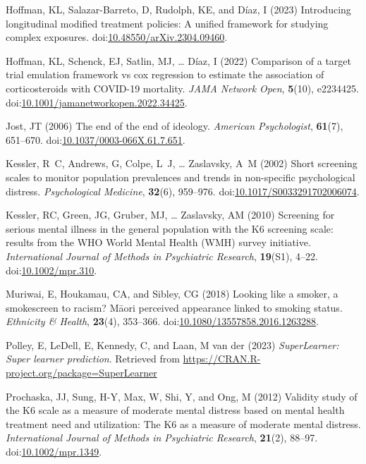 \documentclass[
  singlecolumn,
  9pt]{article}
\newlength{\cslhangindent}
\newenvironment{CSLReferences}[2] %
 {\begin{list}{}{%
  \setlength{\itemindent}{0pt}
  \setlength{\leftmargin}{0pt}
  \setlength{\parsep}{0pt}
  \ifodd #1
   \setlength{\leftmargin}{\cslhangindent}
   \setlength{\itemindent}{-1\cslhangindent}
  \fi
  \setlength{\itemsep}{#2\baselineskip}}}
 {\end{list}}
\begin{document}
\begin{CSLReferences}{1}{0}
Hoffman, KL, Salazar-Barreto, D, Rudolph, KE, and Díaz, I (2023)
Introducing longitudinal modified treatment policies: A unified
framework for studying complex exposures.
doi:\href{https://doi.org/10.48550/arXiv.2304.09460}{10.48550/arXiv.2304.09460}.

Hoffman, KL, Schenck, EJ, Satlin, MJ, \ldots{} Díaz, I (2022) Comparison
of a target trial emulation framework vs cox regression to estimate the
association of corticosteroids with COVID-19 mortality. \emph{JAMA
Network Open}, \textbf{5}(10), e2234425.
doi:\href{https://doi.org/10.1001/jamanetworkopen.2022.34425}{10.1001/jamanetworkopen.2022.34425}.

Jost, JT (2006) The end of the end of ideology. \emph{American
Psychologist}, \textbf{61}(7), 651--670.
doi:\href{https://doi.org/10.1037/0003-066X.61.7.651}{10.1037/0003-066X.61.7.651}.

Kessler, R~C, Andrews, G, Colpe, L~J, \ldots{} Zaslavsky, A~M (2002)
Short screening scales to monitor population prevalences and trends in
non-specific psychological distress. \emph{Psychological Medicine},
\textbf{32}(6), 959--976.
doi:\href{https://doi.org/10.1017/S0033291702006074}{10.1017/S0033291702006074}.

Kessler, RC, Green, JG, Gruber, MJ, \ldots{} Zaslavsky, AM (2010)
Screening for serious mental illness in the general population with the
K6 screening scale: results from the WHO World Mental Health (WMH)
survey initiative. \emph{International Journal of Methods in Psychiatric
Research}, \textbf{19}(S1), 4--22.
doi:\href{https://doi.org/10.1002/mpr.310}{10.1002/mpr.310}.

Muriwai, E, Houkamau, CA, and Sibley, CG (2018) Looking like a smoker, a
smokescreen to racism? Māori perceived appearance linked to smoking
status. \emph{Ethnicity \& Health}, \textbf{23}(4), 353--366.
doi:\href{https://doi.org/10.1080/13557858.2016.1263288}{10.1080/13557858.2016.1263288}.

Polley, E, LeDell, E, Kennedy, C, and Laan, M van der (2023)
\emph{SuperLearner: Super learner prediction}. Retrieved from
\url{https://CRAN.R-project.org/package=SuperLearner}

Prochaska, JJ, Sung, H-Y, Max, W, Shi, Y, and Ong, M (2012) Validity
study of the K6 scale as a measure of moderate mental distress based on
mental health treatment need and utilization: The K6 as a measure of
moderate mental distress. \emph{International Journal of Methods in
Psychiatric Research}, \textbf{21}(2), 88--97.
doi:\href{https://doi.org/10.1002/mpr.1349}{10.1002/mpr.1349}.


\end{CSLReferences}
\end{document}
